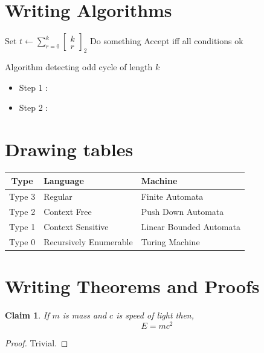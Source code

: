 \documentclass[10pt,a4paper]{article}
\newtheorem{claim}[theorem]{Claim}
\begin{document}
\section{Writing Algorithms}
\begin{algorithm}
        Set $t \gets \sum_{r=0}^k \begin{bmatrix} k \\ r \end{bmatrix}_2$ \;
        Do something
        Accept iff all conditions ok
        \caption{Algorithm detecting odd cycle of length $k$}
\end{algorithm}
\begin{itemize}
\item Step 1  :
\item Step 2 :
\end{itemize}


\section{Drawing tables}
\begin{center}
\begin{tabular}{||c|l|l||}
\hline 
\textbf{Type} & \textbf{Language} & \textbf{Machine} \\ 
\hline \hline
Type 3 & Regular & Finite Automata \\ 
\hline 
Type 2 & Context Free & Push Down Automata \\ 
\hline 
Type 1 & Context Sensitive & Linear Bounded Automata \\ 
\hline
Type 0 & Recursively Enumerable & Turing Machine \\ 
\hline 
\end{tabular} 
\end{center}

\section{Writing Theorems and Proofs} \label{sec:rel}
\begin{claim} \label{cl:relativity}
If $m$ is mass and $c$ is speed of light then, 
\begin{equation} \label{eq:relativity}
E = mc^2
\end{equation}

\end{claim}
\begin{proof}
Trivial. 
\end{proof}
\end{document}
